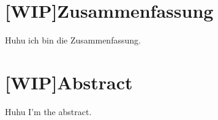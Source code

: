 \clearpage
\section*{[WIP]Zusammenfassung}

Huhu ich bin die Zusammenfassung.

\section*{[WIP]Abstract}

Huhu I'm the abstract.
